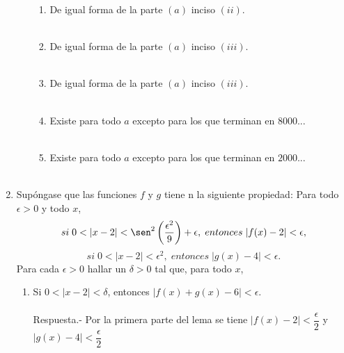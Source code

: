 \begin{enumerate}
\begin{enumerate}[\bfseries (a)]
\begin{enumerate}[\bfseries (i)]
	\item De igual forma de la parte $(a)$ inciso $(ii)$.\\\\
	
	\item De igual forma de la parte $(a)$ inciso $(iii)$.\\\\
	
	\item De igual forma de la parte $(a)$ inciso $(iii)$.\\\\
	
	\item Existe para todo $a$ excepto para los que terminan en $8000...$\\\\
	
	\item Existe para todo $a$ excepto para los que terminan en $2000...$\\\\

    \end{enumerate}

\end{enumerate}

\item Supóngase que las funciones $f$ y $g$ tiene n la siguiente propiedad: Para todo $\epsilon>0$ y todo $x$, $$si \; 0<|x-2|<\sen^2\left(\dfrac{\epsilon^2}{9}\right) + \epsilon, \; entonces \; |f(x)-2|<\epsilon,$$ $$si \; 0<|x-2|<\epsilon^2, \; entonces \; |g(x)-4| < \epsilon.$$
Para cada $\epsilon>0$ hallar un $\delta>0$ tal que, para todo $x$,\\
\begin{enumerate}[\bfseries (i)]
    
    \item Si $0<|x-2|<\delta$, entonces $|f(x)+g(x)-6|<\epsilon$.\\\\
	Respuesta.-\; Por la primera parte del lema se tiene $|f(x)-2|<\dfrac{\epsilon}{2}$ y $|g(x)-4|<\dfrac{\epsilon}{2}$

\end{enumerate}

\end{enumerate}
